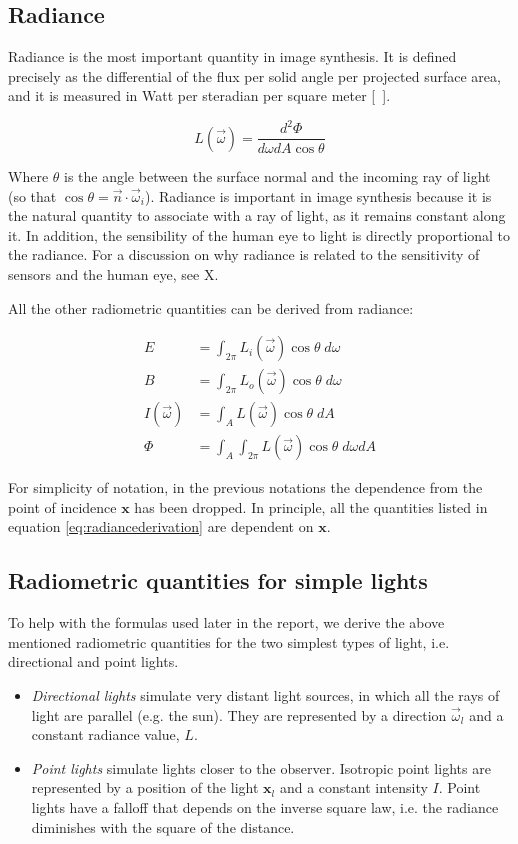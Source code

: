 \subsection{Radiance}
Radiance is the most important quantity in image synthesis. It is defined precisely as the differential of the flux per solid angle per projected surface area, and it is measured in Watt per steradian per square meter [\si{\watt\per\steradian\meter\square}].

$$
L(\vec{\omega}) = \frac{d^2 \Phi}{d\omega dA \cos \theta}
$$

Where $\theta$ is the angle between the surface normal and the incoming ray of light (so that $\cos\theta = \vec{n} \cdot \vec{\omega}_i$). Radiance is important in image synthesis because it is the natural quantity to associate with a ray of light, as it remains constant along it. In addition, the sensibility of the human eye to light is directly proportional to the radiance. For a discussion on why radiance is related to the sensitivity of sensors and the human eye, see X.

All the other radiometric quantities can be derived from radiance:

\begin{equation}
\begin{split}
E &= \int_{2\pi} L_i(\vec{\omega}) \cos\theta \; d\omega \\
B &= \int_{2\pi} L_o(\vec{\omega}) \cos\theta \; d\omega \\
I(\vec{\omega}) &= \int_A L(\vec{\omega}) \cos\theta \; dA \\
\Phi &= \int_A \int_{2\pi} L(\vec{\omega}) \cos\theta \; d\omega dA
\end{split}
\label{eq:radiancederivation} 
\end{equation}

For simplicity of notation, in the previous notations the dependence from the point of incidence $\mathbf{x}$ has been dropped. In principle, all the quantities listed in equation \ref{eq:radiancederivation} are dependent on $\mathbf{x}$.

\subsection{Radiometric quantities for simple lights}

To help with the formulas used later in the report, we derive the above mentioned radiometric quantities for the two simplest types of light, i.e. directional and point lights.
\begin{itemize}
	\item \textit{Directional lights} simulate very distant light sources, in which all the rays of light are parallel (e.g. the sun). They are represented by a direction $\vec{\omega}_l$ and a constant radiance value, $L$. 
	\item \textit{Point lights} simulate lights closer to the observer. Isotropic point lights are represented by a position of the light $\mathbf{x}_l$ and a constant intensity $I$. Point lights have a falloff that depends on the inverse square law, i.e. the radiance diminishes with the square of the distance.
\end{itemize}

